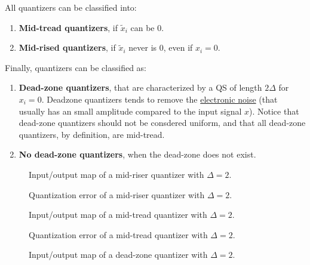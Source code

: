 All quantizers can be classified into:
\begin{enumerate}
\item \textbf{Mid-tread quantizers}, if $\tilde{x}_i$ can be $0$.
\item \textbf{Mid-rised quantizers}, if $\tilde{x}_i$ never is $0$,
  even if $x_i=0$.
\end{enumerate}

Finally, quantizers can be classified as:
\begin{enumerate}
\item \textbf{Dead-zone quantizers}, that are characterized by a QS of
  length $2\Delta$ for $x_i=0$. Deadzone quantizers tends to remove
  the
  \href{https://en.wikipedia.org/wiki/Noise_(electronics)}{electronic
    noise} (that usually has an small amplitude compared to the input
  signal $x$). Notice that dead-zone quantizers should not be
  consdered uniform, and that all dead-zone quantizers, by definition,
  are mid-tread.
\item \textbf{No dead-zone quantizers}, when the dead-zone does not
  exist.
\end{enumerate}

\begin{figure}
  \centering
  \caption{Input/output map of a mid-riser quantizer with $\Delta=2$.}
  \label{fig:iomap_mr}
\end{figure}

\begin{figure}
  \centering
  \caption{Quantization error of a mid-riser quantizer with $\Delta=2$.}
  \label{fig:qe_mr}
\end{figure}

\begin{figure}
  \centering
  \caption{Input/output map of a mid-tread quantizer with $\Delta=2$.}
  \label{fig:iomap_mt}
\end{figure}

\begin{figure}
  \centering
  \caption{Quantization error of a mid-tread quantizer with $\Delta=2$.}
  \label{fig:qe_mt}
\end{figure}

\begin{figure}
  \centering
  \caption{Input/output map of a dead-zone quantizer with $\Delta=2$.}
  \label{fig:iomap_dz}
\end{figure}

